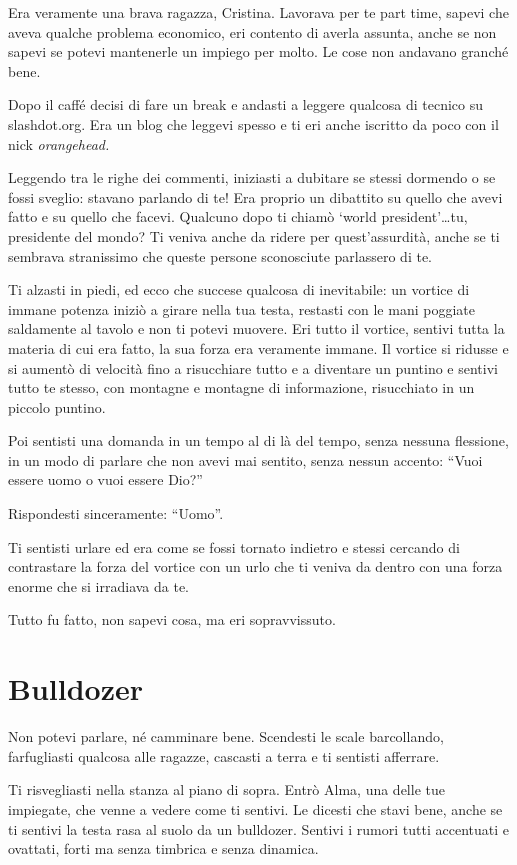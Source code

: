 Era veramente una brava ragazza, Cristina. Lavorava per te part time, sapevi che aveva qualche problema economico, eri contento di averla assunta, anche se non sapevi se potevi mantenerle un impiego per molto. Le cose non andavano granché bene.

Dopo il caffé decisi di fare un break e andasti a leggere qualcosa di tecnico su slashdot.org. Era un blog che leggevi spesso e ti eri anche iscritto da poco con il nick \textit{orangehead.}

Leggendo tra le righe dei commenti, iniziasti a dubitare se stessi dormendo o se fossi sveglio: stavano parlando di te! Era proprio un dibattito su quello che avevi fatto e su quello che facevi. Qualcuno dopo ti chiamò `world president'\ldots tu, presidente del mondo? Ti veniva anche da ridere per quest'assurdità, anche se ti sembrava stranissimo che queste persone sconosciute parlassero di te.

Ti alzasti in piedi, ed ecco che succese qualcosa di inevitabile: un vortice di immane potenza iniziò a girare nella tua testa, restasti con le mani poggiate saldamente al tavolo e non ti potevi muovere. Eri tutto il vortice, sentivi tutta la materia di cui era fatto, la sua forza era veramente immane. Il vortice si ridusse e si aumentò di velocità fino a risucchiare tutto e a diventare un puntino e sentivi tutto te stesso, con montagne e montagne di informazione, risucchiato in un piccolo puntino.

Poi sentisti una domanda in un tempo al di là del tempo, senza nessuna flessione, in un modo di parlare che non avevi mai sentito, senza nessun accento: “Vuoi essere uomo o vuoi essere Dio?”

Rispondesti sinceramente: “Uomo”.

Ti sentisti urlare ed era come se fossi tornato indietro e stessi cercando di contrastare la forza del vortice con un urlo che ti veniva da dentro con una forza enorme che si irradiava da te.

Tutto fu fatto, non sapevi cosa, ma eri sopravvissuto.

\section{Bulldozer}
\label{bulldozer} 

Non potevi parlare, né camminare bene. Scendesti le scale barcollando, farfugliasti qualcosa alle ragazze, cascasti a terra e ti sentisti afferrare.

Ti risvegliasti nella stanza al piano di sopra. Entrò Alma, una delle tue impiegate, che venne a vedere come ti sentivi. Le dicesti che stavi bene, anche se ti sentivi la testa rasa al suolo da un bulldozer. Sentivi i rumori tutti accentuati e ovattati, forti ma senza timbrica e senza dinamica.

